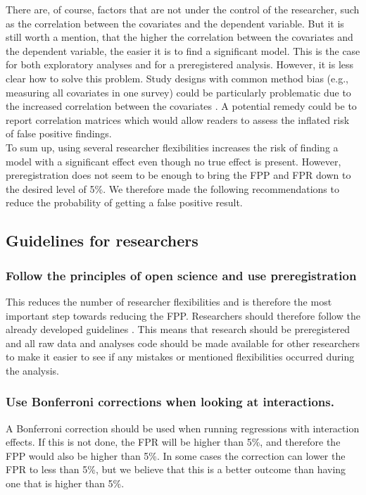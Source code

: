 There are, of course, factors that are not under the control of the researcher, such as the correlation between the covariates and the dependent variable. But it is still worth a mention, that the higher the correlation between the covariates and the dependent variable, the easier it is to find a significant model. This is the case for both exploratory analyses and for a preregistered analysis. However, it is less clear how to solve this problem. Study designs with common method bias (e.g., measuring all covariates in one survey) could be particularly problematic due to  the increased correlation between the covariates \citep{podsakoff2003}. A potential remedy could be to report correlation matrices which would allow readers to assess the inflated risk of false positive findings.  \\ 

To sum up, using several researcher flexibilities increases the risk of finding a model with a significant effect even though no true effect is present. However, preregistration does not seem to be enough to bring the FPP and FPR down to the desired level of 5\%. We therefore made the following recommendations to reduce the probability of getting a false positive result. 

\subsection{Guidelines for researchers}

\subsubsection{Follow the principles of open science and use preregistration}
This reduces the number of researcher flexibilities and is therefore the most important step towards reducing the FPP. Researchers should therefore follow the already developed guidelines \citep{Nosek2015}. This means that research should be preregistered and all raw data and analyses code should be made available for other researchers to make it easier to see if any mistakes or mentioned flexibilities occurred during the analysis. 
\subsubsection{Use Bonferroni corrections when looking at interactions.}
A Bonferroni correction should be used when running regressions with interaction effects. If this is not done, the FPR will be higher than 5\%, and therefore the FPP would also be higher than 5\%. In some cases the correction can lower the FPR to less than 5\%, but we believe that this is a better outcome than having one that is higher than 5\%. 
